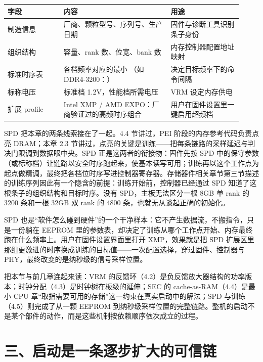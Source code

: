 \begin{longtable}{L{0.22\linewidth}L{0.42\linewidth}L{0.28\linewidth}}
\toprule
字段 & 内容 & 用途 \\
\midrule
制造信息 & 厂商、颗粒型号、序列号、生产日期 & 固件与诊断工具识别条子身份 \\\tablerowrule
组织结构 & 容量、rank 数、位宽、bank 数 & 内存控制器配置地址映射 \\\tablerowrule
标准时序表 & 各档频率对应的最小 （如 DDR4-3200：） & 决定目标频率下的命令间隔 \\\tablerowrule
标称电压 & 标准档 1.2V，性能档所需电压 & VRM 设定内存供电 \\\tablerowrule
扩展 profile & Intel XMP / AMD EXPO：厂商验证过的高频时序组合 & 用户在固件设置里一键启用超频档 \\
\bottomrule
\end{longtable}

SPD 把本章的两条线索接在了一起。4.4 节讲过，PEI 阶段的内存参考代码负责点亮 DRAM；本章 2.3 节讲过，点亮的关键是训练——把每条链路的采样延迟与判决门限调到数据眼中央。SPD 正是这两者的衔接物：固件先按 SPD 中的保守参数（或标称档）让链路以安全时序跑起来，使基本读写可用；训练再以这个工作点为起点做精调，最终把各档位时序写进控制器寄存器。存储器件相关章节第三节描述的训练序列因此有一个隐含的前提：训练开始前，控制器已经通过 SPD 知道了这根条子的组织结构和目标时序。没有 SPD，主板无法区分一根 8GB 单 rank 的 3200 条和一根 32GB 双 rank 的 4800 条，也就无从谈起正确的初始化。

SPD 也是“软件怎么碰到硬件”的一个干净样本：它不产生数据流，不搬指令，只是一份躺在 EEPROM 里的参数表，却决定了训练从哪个工作点开始、内存最终跑在什么频率上。用户在固件设置界面里打开 XMP，效果就是把 SPD 扩展区里那组更激进的时序换成训练的目标值——一次配置选择，穿过固件、控制器与 PHY，最终改变的是纳秒级的信号采样位置。

\begin{classicnote}
把本节与前几章连起来读：VRM 的反馈环（4.2）是负反馈放大器结构的功率版本；时钟分配（4.3）是时钟树在板级的延伸；SEC 的 cache-as-RAM（4.4）是最小 CPU 章“取指需要可用的存储”这一约束在真实启动中的解法；SPD 与训练（4.5）则完成了从一颗 EEPROM 到纳秒级采样位置的完整链路。整机的启动不是某个部件的动作，而是这些机制按依赖顺序依次成立的过程。
\end{classicnote}
\section{三、启动是一条逐步扩大的可信链}

